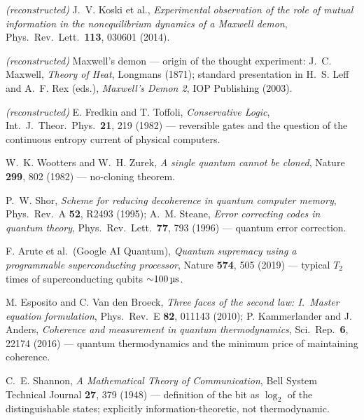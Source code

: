 \documentclass[11pt,a4paper]{article}
\begin{document}
\begin{description}[leftmargin=3.2em,style=sameline,itemsep=0.3em]
\item[{[B11]}] \emph{(reconstructed)} J.~V. Koski et al., \emph{Experimental
observation of the role of mutual information in the nonequilibrium dynamics of a
Maxwell demon}, Phys.\ Rev.\ Lett.\ \textbf{113}, 030601 (2014).

\item[{[B12]}] \emph{(reconstructed)} Maxwell's demon --- origin of the thought
experiment: J.~C. Maxwell, \emph{Theory of Heat}, Longmans (1871); standard
presentation in H.~S. Leff and A.~F. Rex (eds.), \emph{Maxwell's Demon 2}, IOP
Publishing (2003).

\item[{[B13]}] \emph{(reconstructed)} E. Fredkin and T. Toffoli,
\emph{Conservative Logic}, Int.\ J.\ Theor.\ Phys.\ \textbf{21}, 219 (1982) ---
reversible gates and the question of the continuous entropy current of physical
computers.

\item[{[B14]}] W.~K. Wootters and W.~H. Zurek, \emph{A single quantum cannot be
cloned}, Nature \textbf{299}, 802 (1982) --- no-cloning theorem.

\item[{[B15]}] P.~W. Shor, \emph{Scheme for reducing decoherence in quantum
computer memory}, Phys.\ Rev.\ A \textbf{52}, R2493 (1995); A.~M. Steane,
\emph{Error correcting codes in quantum theory}, Phys.\ Rev.\ Lett.\ \textbf{77},
793 (1996) --- quantum error correction.

\item[{[B16]}] F. Arute et al.\ (Google AI Quantum), \emph{Quantum supremacy using
a programmable superconducting processor}, Nature \textbf{574}, 505 (2019) ---
typical $T_2$ times of superconducting qubits ${\sim}100\,\text{\textmu s}$.

\item[{[B17]}] M. Esposito and C. Van den Broeck, \emph{Three faces of the second
law: I.\ Master equation formulation}, Phys.\ Rev.\ E \textbf{82}, 011143 (2010);
P. Kammerlander and J. Anders, \emph{Coherence and measurement in quantum
thermodynamics}, Sci.\ Rep.\ \textbf{6}, 22174 (2016) --- quantum thermodynamics
and the minimum price of maintaining coherence.

\item[{[B18]}] C.~E. Shannon, \emph{A Mathematical Theory of Communication}, Bell
System Technical Journal \textbf{27}, 379 (1948) --- definition of the bit as
$\log_2$ of the distinguishable states; explicitly information-theoretic, not
thermodynamic.


\end{description}
\end{document}
